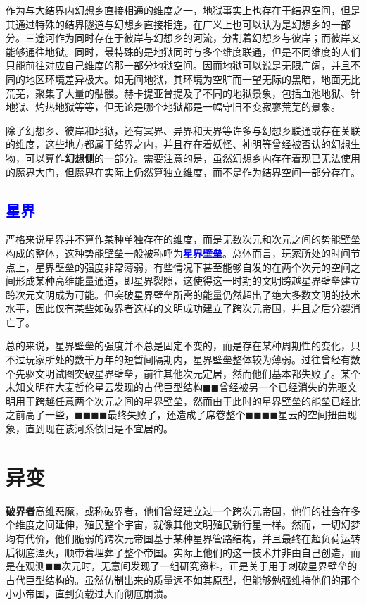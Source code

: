 \documentclass[10.5pt,compsoc,UTF8]{CjC}
\theoremstyle{mystyle}
\begin{document}
{作为与大结界内幻想乡直接相通的维度之一，地狱事实上也存在于结界空间，但是其通过特殊的结界隧道与幻想乡直接相连，在广义上也可以认为是幻想乡的一部分。三途河作为同时存在于彼岸与幻想乡的河流，分割着幻想乡与彼岸；而彼岸又能够通往地狱。同时，最特殊的是地狱同时与多个维度联通，但是不同维度的人们只能前往对应自己维度的那一部分地狱空间。因而地狱可以说是无限广阔，并且不同的地区环境差异极大。如无间地狱，其环境为空旷而一望无际的黑暗，地面无比荒芜，聚集了大量的骷髅。赫卡提亚曾提及了不同的地狱景象，包括血池地狱、针地狱、灼热地狱等等，但无论是哪个地狱都是一幅守旧不变寂寥荒芜的景象。

除了幻想乡、彼岸和地狱，还有冥界、异界和天界等许多与幻想乡联通或存在关联的维度，这些地方都属于结界之内，并且存在着妖怪、神明等曾经被否认的幻想生物，可以算作\textbf{幻想侧}的一部分。需要注意的是，虽然幻想乡内存在着现已无法使用的魔界大门，但魔界在实际上仍然算独立维度，而不是作为结界空间一部分存在。

\subsection{\textcolor{blue}{星界}}

严格来说星界并不算作某种单独存在的维度，而是无数次元和次元之间的势能壁垒构成的整体，这种势能壁垒一般被称呼为\textbf{\textcolor{blue}{星界壁垒}}。总体而言，玩家所处的时间节点上，星界壁垒的强度非常薄弱，有些情况下甚至能够自发的在两个次元的空间之间形成某种高维能量通道，即星界裂隙，这使得这一时期的文明跨越星界壁垒建立跨次元文明成为可能。但突破星界壁垒所需的能量仍然超出了绝大多数文明的技术水平，因此仅有某些如破界者这样的文明成功建立了跨次元帝国，并且之后分裂消亡了。

总的来说，星界壁垒的强度并不总是固定不变的，而是存在某种周期性的变化，只不过玩家所处的数千万年的短暂间隔期内，星界壁垒整体较为薄弱。过往曾经有数个先驱文明试图突破星界壁垒，前往其他次元定居，然而他们基本都失败了。某个未知文明在大麦哲伦星云发现的古代巨型结构$\blacksquare$$\blacksquare$曾经被另一个已经消失的先驱文明用于跨越任意两个次元之间的星界壁垒，然而由于此时的星界壁垒的能垒已经比之前高了一些，$\blacksquare$$\blacksquare$$\blacksquare$$\blacksquare$最终失败了，还造成了席卷整个$\blacksquare$$\blacksquare$$\blacksquare$$\blacksquare$星云的空间扭曲现象，直到现在该河系依旧是不宜居的。

\section{异变}

\textbf{破界者}\quad 高维恶魔，或称破界者，他们曾经建立过一个跨次元帝国，他们的社会在多个维度之间延伸，殖民整个宇宙，就像其他文明殖民新行星一样。然而，一切幻梦均有代价，他们脆弱的跨次元帝国基于某种星界管路结构，并且最终在超负荷运转后彻底湮灭，顺带着埋葬了整个帝国。实际上他们的这一技术并非由自己创造，而是在观测$\blacksquare$$\blacksquare$次元时，无意间发现了一组研究资料，正是关于用于刺破星界壁垒的古代巨型结构的。虽然仿制出来的质量远不如其原型，但能够勉强维持他们的那个小小帝国，直到负载过大而彻底崩溃。

}
\end{document}
